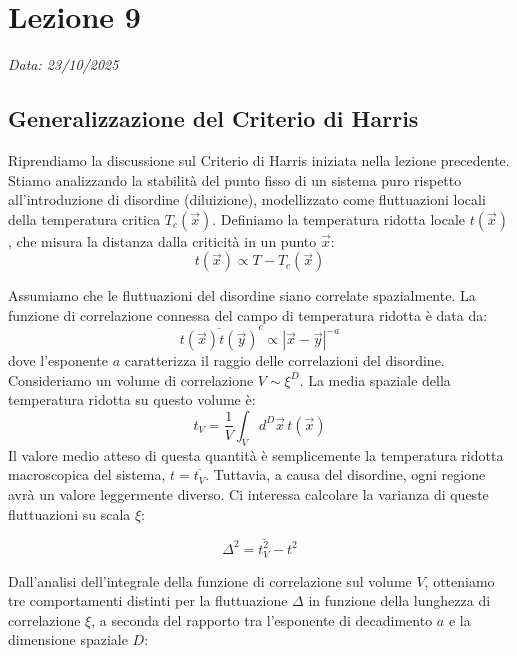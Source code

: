 \chapter{Lezione 9}
\label{chap:lezione_09}

\begin{flushright}
\textit{Data: 23/10/2025}
\end{flushright}


\section{Generalizzazione del Criterio di Harris}

Riprendiamo la discussione sul Criterio di Harris iniziata nella lezione precedente. Stiamo analizzando la stabilità del punto fisso di un sistema puro rispetto all'introduzione di disordine (diluizione), modellizzato come fluttuazioni locali della temperatura critica $T_c(\vec{x})$. Definiamo la temperatura ridotta locale $t(\vec{x})$, che misura la distanza dalla criticità in un punto $\vec{x}$:
\begin{equation}
t(\vec{x}) \propto T - T_c(\vec{x})
\end{equation}

\noindent Assumiamo che le fluttuazioni del disordine siano correlate spazialmente. La funzione di correlazione connessa del campo di temperatura ridotta è data da:
\begin{equation}
\overline{t(\vec{x})t(\vec{y})}^c \propto |\vec{x}-\vec{y}|^{-a}
\end{equation}
dove l'esponente $a$ caratterizza il raggio delle correlazioni del disordine.
Consideriamo un volume di correlazione $V \sim \xi^D$. La media spaziale della temperatura ridotta su questo volume è:
\begin{equation}
t_V = \frac{1}{V} \int_V d^D \vec{x} \, t(\vec{x})
\end{equation}
Il valore medio atteso di questa quantità è semplicemente la temperatura ridotta macroscopica del sistema, $t = \overline{t_V}$. Tuttavia, a causa del disordine, ogni regione avrà un valore leggermente diverso. Ci interessa calcolare la varianza di queste fluttuazioni su scala $\xi$:

\begin{equation}
\Delta^2 = \overline{t_V^2} - t^2
\end{equation}

\noindent Dall'analisi dell'integrale della funzione di correlazione sul volume $V$, otteniamo tre comportamenti distinti per la fluttuazione $\Delta$ in funzione della lunghezza di correlazione $\xi$, a seconda del rapporto tra l'esponente di decadimento $a$ e la dimensione spaziale $D$:

